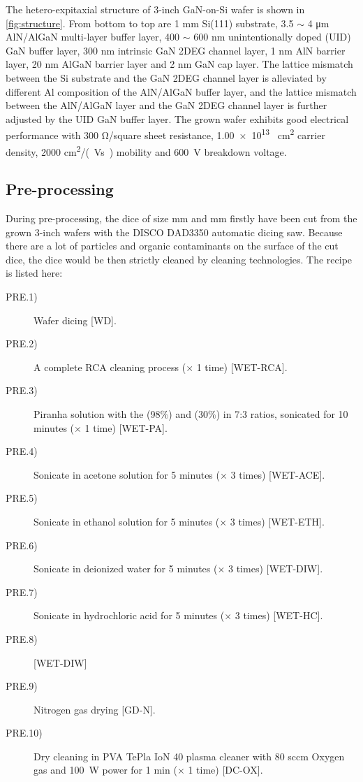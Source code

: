 The  hetero-expitaxial structure of 3-inch GaN-on-Si wafer is shown in \autoref{fig:structure}. From bottom to top are 1 \unit{mm} Si(111) substrate, 3.5 $\sim$ 4 \unit{\um} AlN/AlGaN multi-layer buffer layer, 400 $\sim$ 600 \unit{\nm} unintentionally doped (UID) GaN buffer layer, 300 \unit{\nm} intrinsic GaN 2DEG channel layer, 1 \unit{\nm} AlN barrier layer, 20 \unit{\nm} AlGaN barrier layer and 2 \unit{\nm} GaN cap layer. The lattice mismatch between the Si substrate and the GaN 2DEG channel layer is alleviated by different Al composition of the AlN/AlGaN buffer layer, and the lattice mismatch between the AlN/AlGaN layer and the GaN 2DEG  channel  layer is further adjusted by the UID GaN buffer layer. The grown wafer exhibits good electrical performance with 300 \unit{\ohm}/square  sheet resistance, \num{1.00e13} \unit{\per\square\cm} carrier  density, 2000 \unit{cm^2/(Vs)} mobility  and \SI{600}{\volt} breakdown  voltage.

\subsection{Pre-processing}
During  pre-processing, the dice  of size  \unit{mm} and  \unit{mm} firstly have been cut from the grown 3-inch wafers with the DISCO DAD3350 automatic dicing saw. Because there are a lot of particles and organic contaminants on the surface  of the cut dice, the dice would be then strictly cleaned by cleaning technologies. The recipe is listed here:

\begin{description}
	\item[PRE.1)] Wafer  dicing [WD].
	\item[PRE.2)] A complete RCA cleaning  process ($\times$ 1 time) [WET-RCA].
	\item[PRE.3)] Piranha solution  with the  (98$\%$) and  (30$\%$) in 7:3 ratios, sonicated for 10 minutes ($\times$ 1 time) [WET-PA].
	\item[PRE.4)] Sonicate in acetone solution for 5 minutes ($\times$ 3 times) [WET-ACE].
	\item[PRE.5)] Sonicate in  ethanol solution for 5 minutes ($\times$ 3 times) [WET-ETH].
	\item[PRE.6)] Sonicate in deionized water  for 5 minutes ($\times$ 3 times) [WET-DIW].
	\item[PRE.7)] Sonicate in hydrochloric acid  for 5 minutes ($\times$ 3 times) [WET-HC].
	\item[PRE.8)] [WET-DIW]
	\item[PRE.9)] Nitrogen gas drying [GD-N].
	\item[PRE.10)] Dry cleaning  in PVA TePla IoN 40 plasma cleaner with 80 sccm Oxygen gas and \SI{100}{\watt} power for 1 min ($\times$ 1 time) [DC-OX].
\end{description}


